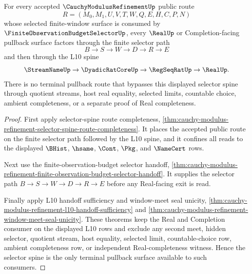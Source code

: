 \begin{theorem}
\label{thm:cauchy-modulus-refinement-selector-spine-terminal-pullback}
For every accepted $\CauchyModulusRefinementUp$ public route
$$
R=(M_0,M_1,U,V,T,W,Q,E,H,C,P,N)
$$
whose selected finite-window surface is consumed by
$\FiniteObservationBudgetSelectorUp$, every $\RealUp$ or Completion-facing
pullback surface factors through the finite selector path
$$
B \to S \to W \to D \to R \to E
$$
and then through the L10 spine
$$
\StreamNameUp \to \DyadicRatCoreUp \to \RegSeqRatUp \to \RealUp.
$$
There is no terminal pullback route that bypasses this displayed selector
spine through quotient streams, host real equality, selected limits, countable
choice, ambient completeness, or a separate proof of Real completeness.
\end{theorem}
\begin{proof}
First apply selector-spine route completeness,
\autoref{thm:cauchy-modulus-refinement-selector-spine-route-completeness}. It
places the accepted public route on the finite selector path followed by the
L10 spine, and it confines all reads to the displayed $\BHist$, $\hsame$,
$\Cont$, $\Pkg$, and $\NameCert$ rows.

Next use the finite-observation-budget selector handoff,
\autoref{thm:cauchy-modulus-refinement-finite-observation-budget-selector-handoff}.
It supplies the selector path
$B \to S \to W \to D \to R \to E$ before any Real-facing exit is read.

Finally apply L10 handoff sufficiency and window-meet seal unicity,
\autoref{thm:cauchy-modulus-refinement-l10-handoff-sufficiency} and
\autoref{thm:cauchy-modulus-refinement-window-meet-seal-unicity}. These
theorems keep the Real and Completion consumer on the displayed L10 rows and
exclude any second meet, hidden selector, quotient stream, host equality,
selected limit, countable-choice row, ambient completeness row, or independent
Real-completeness witness. Hence the selector spine is the only terminal
pullback surface available to such consumers.
\end{proof}

